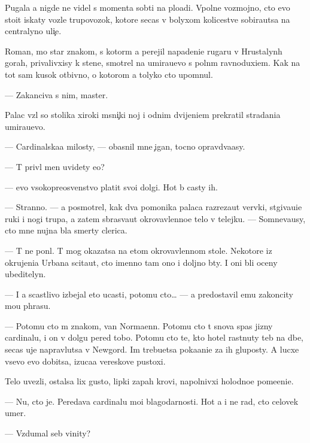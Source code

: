 \documentclass[10pt]{book}
\begin{document}
Pugala {\y}a nigde ne videl s momenta sob{\yi}ti{\y} na plo{\x}adi. Vpolne vozmojno, cto {\y}evo stoit iskaty vozle trupovozok, kotor{\yi}{\y}e se{\y}cas v bolyxom kolicestve sobira{\y}utsa na centralyno{\y} uli{\c}e.

Roman, mo{\y} star{\yi}{\y} znakom{\yi}{\y}, s kotor{\yi}m {\y}a perejil napadeni{\y}e rugaru v Hrustalyn{\yi}h gorah, privalivxisy k stene, smotrel na umira{\y}u{\x}evo s poln{\yi}m ravnoduxi{\y}em. Kak na tot sam{\yi}{\y} kusok otbivno{\y}, o kotorom {\y}a tolyko cto upom{\ia}nul.

— Zakanciva{\y} s nim, master.

Palac vz{\ia}l so stolika xiroki{\y} m{\ia}sni{\c}ki{\y} noj i odnim dvijeni{\y}em prekratil stradani{\y}a umira{\y}u{\x}evo.

— Cardinalska{\y}a milosty, — ob{\y}asnil mne {\c}igan, tocno opravd{\yi}va{\y}asy.

— T{\yi} priv{\e}l men{\ia} uvidety {\y}e{\y}o?

— {\Y}evo v{\yi}sokopreosv{\ia}{\x}enstvo platit svo{\y}i dolgi. Hot{\ia} b{\yi} casty ih.

— Stranno. — {\Y}a posmotrel, kak dva pomo{\x}nika palaca razreza{\y}ut ver{\e}vki, st{\ia}giva{\y}u{\x}i{\y}e ruki i nogi trupa, a zatem sbras{\yi}va{\y}ut okrovavlenno{\y}e telo v telejku. — Somneva{\y}usy, cto mne nujna b{\yi}la smerty clerica.

— T{\yi} ne pon{\ia}l. T{\yi} mog okazatsa na etom okrovavlennom stole. Nekotor{\yi}{\y}e iz okrujeni{\y}a Urbana scita{\y}ut, cto imenno tam ono i doljno b{\yi}ty. I oni b{\yi}li oceny ubeditelyn{\yi}.

— I {\y}a scastlivo izbejal eto{\y} ucasti, potomu cto… — {\Y}a predostavil {\y}emu zakoncity mo{\y}u phrasu.

— Potomu cto m{\yi} znakom{\yi}, van Normaenn. Potomu cto t{\yi} snova spas jizny cardinalu, i on v dolgu pered tobo{\y}. Potomu cto te, kto hotel rast{\ia}nuty teb{\ia} na d{\yi}be, se{\y}cas uje napravl{\ia}{\y}utsa v Newgord. Im trebu{\y}etsa poka{\y}ani{\y}e za ih gluposty. A lucxe vsevo {\y}evo dobitsa, izuca{\y}a vereskov{\yi}{\y}e pustoxi.

Telo uvezli, ostalsa lix gusto{\y}, lipki{\y} zapah krovi, napolnivxi{\y} holodno{\y}e pome{\x}eni{\y}e.

— Nu, cto je. Peredava{\y} cardinalu mo{\y}i blagodarnosti. Hot{\ia} {\y}a i ne rad, cto celovek umer.

— Vzdumal seb{\ia} vinity?
\end{document}
